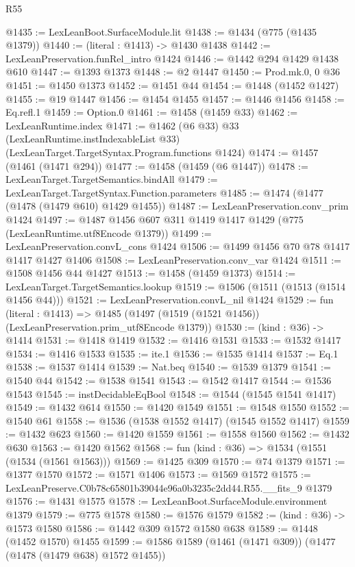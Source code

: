 \begin{lexlean}{R55}
\begin{coremodule}
{{@1435 := LexLeanBoot.SurfaceModule.lit
@1438 := @1434 (@775 (@1435 @1379))
@1440 := (literal : @1413) -> @1430 @1438
@1442 := LexLeanPreservation.funRel_intro @1424
@1446 := @1442 @294 @1429 @1438 @610
@1447 := @1393 @1373
@1448 := @2 @1447
@1450 := Prod.mk.{0, 0} @36
@1451 := @1450 @1373
@1452 := @1451 @44
@1454 := @1448 (@1452 @1427)
@1455 := @19 @1447
@1456 := @1454 @1455
@1457 := @1446 @1456
@1458 := Eq.refl.{1}
@1459 := Option.{0}
@1461 := @1458 (@1459 @33)
@1462 := LexLeanRuntime.index
@1471 := @1462
    (@6 @33)
    @33
    (LexLeanRuntime.instIndexableList @33)
    (LexLeanTarget.TargetSyntax.Program.functions @1424)
@1474 := @1457 (@1461 (@1471 @294))
@1477 := @1458 (@1459 (@6 @1447))
@1478 := LexLeanTarget.TargetSemantics.bindAll
@1479 := LexLeanTarget.TargetSyntax.Function.parameters
@1485 := @1474 (@1477 (@1478 (@1479 @610) @1429 @1455))
@1487 := LexLeanPreservation.conv_prim @1424
@1497 := @1487 @1456 @607 @311 @1419 @1417 @1429 (@775 (LexLeanRuntime.utf8Encode @1379))
@1499 := LexLeanPreservation.convL_cons @1424
@1506 := @1499 @1456 @70 @78 @1417 @1417 @1427 @1406
@1508 := LexLeanPreservation.conv_var @1424
@1511 := @1508 @1456 @44 @1427
@1513 := @1458 (@1459 @1373)
@1514 := LexLeanTarget.TargetSemantics.lookup
@1519 := @1506 (@1511 (@1513 (@1514 @1456 @44)))
@1521 := LexLeanPreservation.convL_nil @1424
@1529 := fun (literal : @1413) =>
  @1485 (@1497 (@1519 (@1521 @1456)) (LexLeanPreservation.prim_utf8Encode @1379))
@1530 := (kind : @36) -> @1414
@1531 := @1418 @1419
@1532 := @1416 @1531
@1533 := @1532 @1417
@1534 := @1416 @1533
@1535 := ite.{1}
@1536 := @1535 @1414
@1537 := Eq.{1}
@1538 := @1537 @1414
@1539 := Nat.beq
@1540 := @1539 @1379
@1541 := @1540 @44
@1542 := @1538 @1541
@1543 := @1542 @1417
@1544 := @1536 @1543
@1545 := instDecidableEqBool
@1548 := @1544 (@1545 @1541 @1417)
@1549 := @1432 @614
@1550 := @1420 @1549
@1551 := @1548 @1550
@1552 := @1540 @61
@1558 := @1536 (@1538 @1552 @1417) (@1545 @1552 @1417)
@1559 := @1432 @623
@1560 := @1420 @1559
@1561 := @1558 @1560
@1562 := @1432 @630
@1563 := @1420 @1562
@1568 := fun (kind : @36) => @1534 (@1551 (@1534 (@1561 @1563)))
@1569 := @1425 @309
@1570 := @74 @1379
@1571 := @1377 @1570
@1572 := @1571 @1406
@1573 := @1569 @1572
@1575 := LexLeanPreserve.C0b78c65801b39044e96a0b3235c2dd44.R55.__fits_9 @1379
@1576 := @1431 @1575
@1578 := LexLeanBoot.SurfaceModule.environment @1379
@1579 := @775 @1578
@1580 := @1576 @1579
@1582 := (kind : @36) -> @1573 @1580
@1586 := @1442 @309 @1572 @1580 @638
@1589 := @1448 (@1452 @1570) @1455
@1599 := @1586 @1589 (@1461 (@1471 @309)) (@1477 (@1478 (@1479 @638) @1572 @1455))
}}
\end{coremodule}
\end{lexlean}
